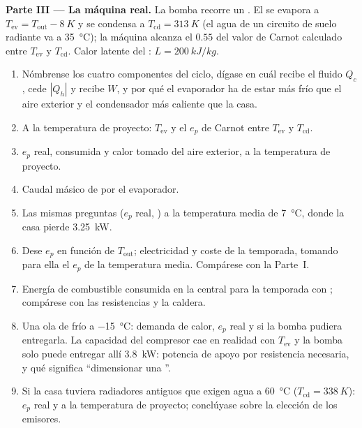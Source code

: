 \begin{problem}
\medskip
\noindent\textbf{Parte III --- La máquina real.}
La bomba recorre un . El  se
evapora a $T_{\mathrm{ev}} = T_{\mathrm{out}} - \qty{8}{K}$ y se condensa a
$T_{\mathrm{cd}} = \qty{313}{K}$ (el agua de un circuito de suelo radiante va a
\qty{35}{\degreeCelsius}); la máquina alcanza el $0.55$ del valor de Carnot
calculado entre $T_{\mathrm{ev}}$ y $T_{\mathrm{cd}}$. Calor latente del
: $L = \qty{200}{kJ/kg}$.
\begin{enumerate}[resume]
  \item Nómbrense los cuatro componentes del ciclo, dígase en cuál recibe
        el fluido $Q_c$, cede $|Q_h|$ y recibe $W$, y por qué el evaporador
        ha de estar más frío que el aire exterior y el condensador más
        caliente que la casa.
  \item A la temperatura de proyecto: $T_{\mathrm{ev}}$ y el $e_p$ de Carnot
        entre $T_{\mathrm{ev}}$ y $T_{\mathrm{cd}}$.
  \item $e_p$ real,  consumida y calor tomado del aire
        exterior, a la temperatura de proyecto.
  \item Caudal másico de  por el evaporador.
  \item Las mismas preguntas ($e_p$ real, ) a la
        temperatura media de \qty{7}{\degreeCelsius}, donde la casa pierde
        \qty{3.25}{kW}.
  \item Dese $e_p$ en función de $T_{\mathrm{out}}$; electricidad y coste de
        la temporada, tomando para ella el $e_p$ de la temperatura media.
        Compárese con la Parte~I.
  \item Energía de combustible consumida en la central para la temporada
        con ; compárese con las resistencias y la caldera.
  \item Una ola de frío a \qty{-15}{\degreeCelsius}: demanda de calor, $e_p$
        real y  si la bomba pudiera entregarla. La
        capacidad del compresor cae en realidad con $T_{\mathrm{ev}}$ y la
        bomba solo puede entregar allí \qty{3.8}{kW}: potencia de apoyo por
        resistencia necesaria, y qué significa ``dimensionar una ''.
  \item Si la casa tuviera radiadores antiguos que exigen agua a
        \qty{60}{\degreeCelsius} ($T_{\mathrm{cd}} = \qty{338}{K}$): $e_p$ real
        y  a la temperatura de proyecto; conclúyase sobre
        la elección de los emisores.
\end{enumerate}


\end{problem}

